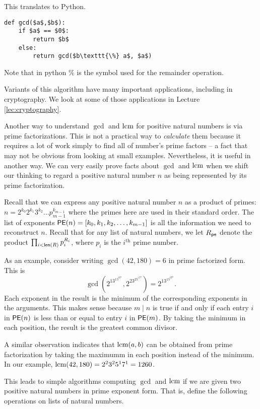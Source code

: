 This translates to Python.
\begin{code}
\begin{lstlisting}
def gcd($a$,$b$):
    if $a$ == $0$:
        return $b$
    else:
        return gcd($b\texttt{\%} a$, $a$)
\end{lstlisting}

\noindent Note that in python $\texttt{\%}$ is the symbol used for the remainder operation.
\end{code}

Variants of this algorithm have many important applications, including in cryptography. We look at some of those applications in Lecture \ref{lec:cryptography}.

Another way to understand $\gcd$ and $\operatorname{lcm}$ for positive natural numbers is via prime factorizations. 
This is not a practical way to \emph{calculate} them because it requires a lot of work simply to find all of number's prime factors -- a fact that may not be obvious from looking at small examples. Nevertheless, it is useful in another way. We can very easily prove facts about $\gcd$ and $\operatorname{lcm}$ when we shift our thinking to regard a positive natural number $n$ as being represented by its prime factorization.

Recall that we can express any positive natural number $n$ as a product of primes: 
$n = 2^{k_0}2^{k_1}3^{k_2}\dots p_{m-1}^{k_{m-1}}$ where the primes here are used in their standard order. The list of exponents $\mathord{\textsf{PE}}(n) = [k_0,k_1,k_2,\dots,k_{m-1}]$ is all the information we need to reconstruct $n$. Recall that for any list of natural numbers, we let $R_{\mathord{\textsf{pe}}}$ denote
the product $\prod_{i<\mathord{\textsf{len}}(R)} p_i^{R_i}$, where $p_i$ is the $i^{\text{th}}$ prime number.

As an example, consider writing $\gcd(42,180)=6$ in prime factorized form. 
This is \[\gcd(2^13^15^07^1, 2^23^25^17^0) = 2^13^15^07^0.\] 
Each exponent in the result is the minimum of the corresponding exponents in the arguments. 
This makes sense because $m\mid n$ is true if and only if each entry $i$ in $\mathord{\textsf{PE}}(n)$ is less than or equal to entry $i$ in $\mathord{\textsf{PE}}(m)$.
By taking the minimum in each position, the result is the greatest common divisor.

A similar observation indicates that $\operatorname{lcm}(a,b)$ can be obtained from prime factorization by taking the maximumm in each position instead of the minimum. In our example,
$\operatorname{lcm}(42,180) = 2^23^25^17^1 = 1260$.

This leads to simple algorithms computing $\gcd$ and $\operatorname{lcm}$ if we are given two positive natural numbers in prime exponent form. That is, define the following operations on lists of natural numbers.


